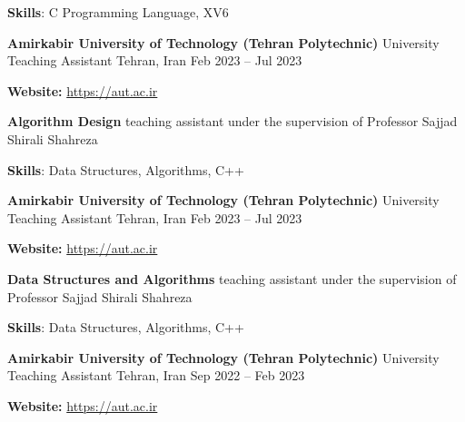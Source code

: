 \documentclass[]{awesome-cv}
\begin{document}
\begin{cventries}
{\begin{cvitems}
		\vspace{1mm}
        \item {\textbf{Skills}: C Programming Language, XV6}
        \vspace{1mm}
	\end{cvitems}}
    \cventry
    {\textbf{Amirkabir University of Technology (Tehran Polytechnic)}}
	{University Teaching Assistant}
	{Tehran, Iran}
	{Feb 2023 – Jul 2023}
	{\begin{cvitems}
        \vspace{1mm}
        \item[] {\hspace{-9mm}\textbf{Website:} \href{https://aut.ac.ir}{\textcolor{awesome}{https://aut.ac.ir}}}
		\vspace{1mm}
		\item[] {\hspace{-9mm}}\textbf{Algorithm Design} teaching assistant under the supervision of Professor Sajjad Shirali Shahreza
		\vspace{1mm}
        \item {\textbf{Skills}: Data Structures, Algorithms, C++}
        \vspace{1mm}
	\end{cvitems}}
    \cventry
    {\textbf{Amirkabir University of Technology (Tehran Polytechnic)}}
	{University Teaching Assistant}
	{Tehran, Iran}
	{Feb 2023 – Jul 2023}
	{\begin{cvitems}
        \vspace{1mm}
        \item[] {\hspace{-9mm}\textbf{Website:} \href{https://aut.ac.ir}{\textcolor{awesome}{https://aut.ac.ir}}}
		\vspace{1mm}
		\item[] {\hspace{-9mm}}\textbf{Data Structures and Algorithms} teaching assistant under the supervision of Professor Sajjad Shirali Shahreza
		\vspace{1mm}
        \item {\textbf{Skills}: Data Structures, Algorithms, C++}
        \vspace{1mm}
	\end{cvitems}}
    \cventry
    {\textbf{Amirkabir University of Technology (Tehran Polytechnic)}}
	{University Teaching Assistant}
	{Tehran, Iran}
	{Sep 2022 – Feb 2023}
	{\begin{cvitems}
        \vspace{1mm}
        \item[] {\hspace{-9mm}\textbf{Website:} \href{https://aut.ac.ir}{\textcolor{awesome}{https://aut.ac.ir}}}

\end{cvitems}}
\end{cventries}
\end{document}
